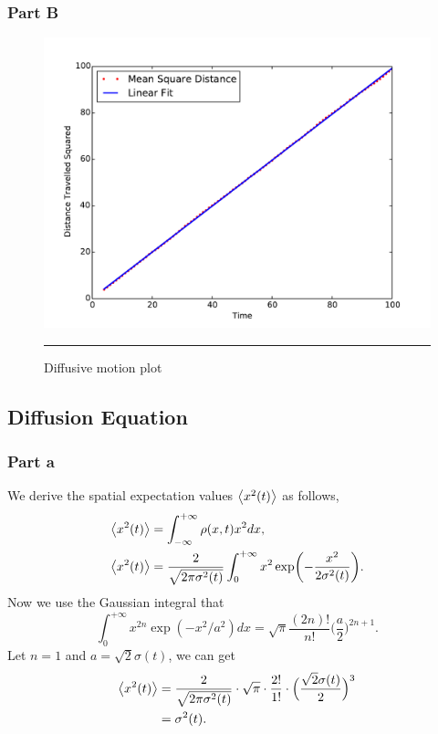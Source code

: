 \documentclass[notitlepage,aps,prd,nofootinbib]{revtex4-1}
\begin{document}
\newpage

\subsubsection{Part B}
\begin{figure}[!htbc]
  \centering
  \includegraphics[width=.6\textwidth]{../output/plots_for_paper/problem_1/Diffusion_Plot.pdf}
  	{\par\nobreak\rule[9pt]{35em}{0.5pt}\vspace{-5mm}}
	\caption{Diffusive motion plot}
	\label{fig:1_b}
\end{figure}

\subsection{Diffusion Equation}
\label{subsec:results_2}
\subsubsection{Part a}
\label{subsubsec:results_2_a}
We derive the spatial expectation values $\expval{x^{2}(t)}$ as follows,
\begin{align}
	\expval{x^{2}(t)} &= \int_{-\infty}^{+\infty} \rho(x, t) x^{2} dx, \\
	\expval{x^{2}(t)} &= \frac{2}{\sqrt{2\pi\sigma^{2}(t)}} \int_{0}^{+\infty} x^{2} \exp(-\frac{x^{2}}{2\sigma^{2}(t)}).
\end{align}
Now we use the Gaussian integral that
\begin{equation}
	\int_{0}^{+\infty} x^{2n} \exp(-x^{2}/a^{2}) dx = \sqrt{\pi} \frac{(2n)!}{n!}\Big( \frac{a}{2} \Big)^{2n+1}.
\end{equation}
Let $n = 1$ and $a = \sqrt{2}\sigma(t)$, we can get
\begin{equation}
	\begin{split}
		\expval{x^{2}(t)} &= \frac{2}{\sqrt{2\pi\sigma^{2}(t)}} \cdot \sqrt{\pi}\cdot \frac{2!}{1!} \cdot \Big( \frac{\sqrt{2}\sigma(t)}{2} \Big)^{3} \\
		&= \sigma^{2}(t).
	\end{split} 
\end{equation}
\end{document}
